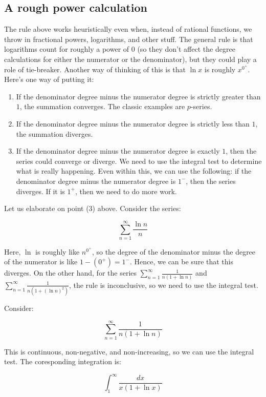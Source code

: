 \documentclass{amsart}
\begin{document}
\subsection{A rough power calculation}

The rule above works heuristically even when, instead of rational
functions, we throw in fractional powers, logarithms, and other
stuff. The general rule is that logarithms count for roughly a power
of $0$ (so they don't affect the degree calculations for either the
numerator or the denominator), but they could play a role of
tie-breaker. Another way of thinking of this is that $\ln x$ is
roughly $x^{0^+}$. Here's one way of putting it:

\begin{enumerate}
\item If the denominator degree minus the numerator degree is strictly
  greater than $1$, the summation converges. The classic examples are
  $p$-series.
\item If the denominator degree minus the numerator degree is strictly
  less than $1$, the summation diverges.
\item If the denominator degree minus the numerator degree is exactly
  $1$, then the series could converge or diverge. We need to use the
  integral test to determine what is really happening. Even within
  this, we can use the following: if the denominator degree minus the
  numerator degree is $1^-$, then the series diverges. If it is $1^+$,
  then we need to do more work.
\end{enumerate}

Let us elaborate on point (3) above. Consider the series:

$$\sum_{n=1}^\infty \frac{\ln n}{n}$$

Here, $\ln$ is roughly like $n^{0^+}$, so the degree of the
denominator minus the degree of the numerator is like $1 - (0^+) =
1^-$. Hence, we can be sure that this diverges. On the other hand, for
the series $\sum_{n=1}^\infty \frac{1}{n(1 + \ln n)}$ and
$\sum_{n=1}^\infty \frac{1}{n(1 + (\ln n)^2)}$, the rule is
inconclusive, so we need to use the integral test.

Consider:

$$\sum_{n=1}^\infty \frac{1}{n(1 + \ln n)}$$

This is continuous, non-negative, and non-increasing, so we can use
the integral test. The coresponding integration is:

$$\int_1^\infty \frac{dx}{x(1 + \ln x)}$$
\end{document}

